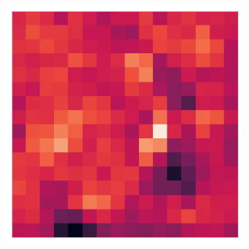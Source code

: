 \begin{figure}
\begin{subfigure}[b]{0.19\textwidth}
     \end{subfigure}
     \hfill
     \begin{subfigure}[b]{0.19\textwidth}
         \centering
         \includegraphics[width=\textwidth, height=\textwidth]{figures/chapter6/features/10988_left/10988_left_4.png}
     \end{subfigure}

    \bigskip


\end{figure}
